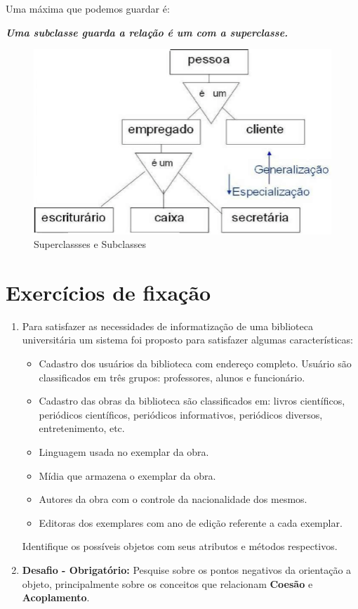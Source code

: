 Uma máxima que podemos guardar é: 

\begin{center}
\textbf{\textit{Uma subclasse guarda a relação é um com a superclasse.}}    
\end{center}

\begin{figure}[H]
  \centering
  \includegraphics[scale=0.5]{imagens/sub-e-sup-classes.png}
  \caption{Superclassses e Subclasses}
  \label{fig:sub-e-sup-classes}
\end{figure}

\section{Exercícios de fixação}\label{exer:001}

\begin{enumerate}
    \item Para satisfazer as necessidades de informatização de uma biblioteca 
universitária um sistema foi proposto para satisfazer algumas características:

\begin{itemize}
  \item Cadastro dos usuários da biblioteca com endereço completo. 
  Usuário são classificados em três grupos: professores, alunos e funcionário.  
  \item Cadastro das obras da biblioteca são classificados em: livros científicos, periódicos científicos, periódicos informativos, periódicos diversos, entretenimento, etc.
  \item Linguagem usada no exemplar da obra.
  \item Mídia que armazena o exemplar da obra.
  \item Autores da obra com o controle da nacionalidade dos mesmos.
  \item Editoras dos exemplares com ano de edição referente a cada exemplar.
\end{itemize}

Identifique os possíveis objetos com seus atributos e métodos respectivos.

\item \textbf{Desafio - Obrigatório:} Pesquise sobre os pontos negativos da orientação a objeto, principalmente sobre os conceitos que relacionam \textbf{Coesão} e \textbf{Acoplamento}.
\end{enumerate}

